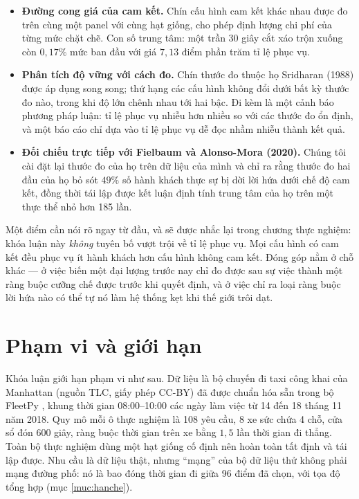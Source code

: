 \begin{itemize}[leftmargin=1.2cm,itemsep=3pt,topsep=4pt]
\item \textbf{Đường cong giá của cam kết.} Chín cấu hình cam kết khác nhau được đo trên cùng
một panel với cùng hạt giống, cho phép định lượng chi phí của từng mức chặt chẽ. Con số trung
tâm: một trần 30 giây cắt xáo trộn xuống còn $0{,}17\%$ mức ban đầu với giá $7{,}13$ điểm phần
trăm tỉ lệ phục vụ.

\item \textbf{Phân tích độ vững với cách đo.} Chín thước đo thuộc họ Sridharan (1988) được áp
dụng song song; thứ hạng các cấu hình không đổi dưới bất kỳ thước đo nào, trong khi độ lớn
chênh nhau tới hai bậc. Đi kèm là một cảnh báo phương pháp luận: tỉ lệ phục vụ nhiễu hơn nhiều
so với các thước đo ổn định, và một báo cáo chỉ dựa vào tỉ lệ phục vụ dễ đọc nhầm nhiễu thành
kết quả.

\item \textbf{Đối chiếu trực tiếp với Fielbaum và Alonso-Mora (2020).} Chúng tôi cài đặt lại
thước đo của họ trên dữ liệu của mình và chỉ ra rằng thước đo hai đầu của họ bỏ sót $49\%$ số
hành khách thực sự bị dời lời hứa dưới chế độ cam kết, đồng thời tái lập được kết luận định
tính trung tâm của họ trên một thực thể nhỏ hơn 185 lần.
\end{itemize}

Một điểm cần nói rõ ngay từ đầu, và sẽ được nhắc lại trong chương thực nghiệm: khóa luận này
\emph{không} tuyên bố vượt trội về tỉ lệ phục vụ. Mọi cấu hình có cam kết đều phục vụ ít hành
khách hơn cấu hình không cam kết. Đóng góp nằm ở chỗ khác --- ở việc biến một đại lượng trước
nay chỉ đo được sau sự việc thành một ràng buộc cưỡng chế được trước khi quyết định, và ở việc
chỉ ra loại ràng buộc lời hứa nào có thể tự nó làm hệ thống kẹt khi thế giới trôi dạt.

\section{Phạm vi và giới hạn}

Khóa luận giới hạn phạm vi như sau. Dữ liệu là bộ chuyến đi taxi công khai của Manhattan
(nguồn TLC, giấy phép CC-BY) đã được chuẩn hóa sẵn trong bộ FleetPy \cite{fleetpy2022}, khung
thời gian 08:00--10:00 các ngày làm việc từ 14 đến 18 tháng 11 năm 2018. Quy mô mỗi ô thực
nghiệm là 108 yêu cầu, 8 xe sức chứa 4 chỗ, cửa sổ đón 600 giây, ràng buộc thời gian trên xe
bằng $1{,}5$ lần thời gian đi thẳng. Toàn bộ thực nghiệm dùng một hạt giống cố định nên hoàn
toàn tất định và tái lập được. Nhu cầu là dữ liệu thật, nhưng ``mạng'' của bộ dữ liệu thử không
phải mạng đường phố: nó là bao đóng thời gian đi giữa 96 điểm đã chọn, với tọa độ tổng hợp (mục
\ref{muc:hanche}).

